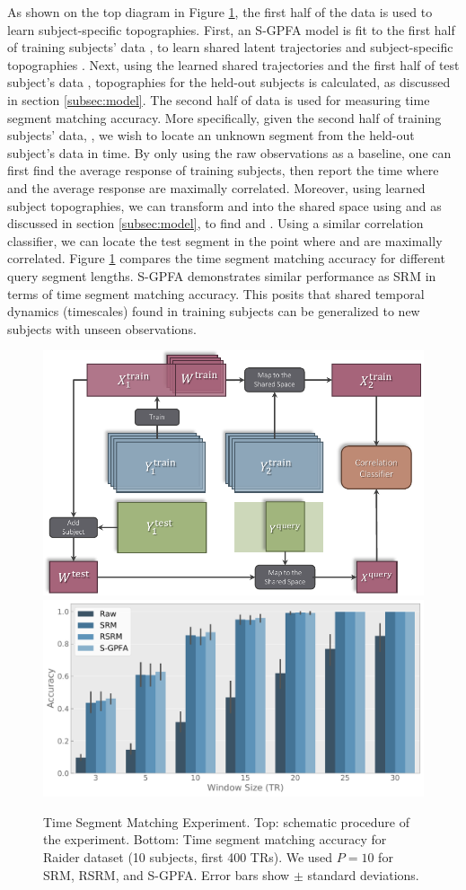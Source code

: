 As shown on the top diagram in Figure \ref{fig:tsm}, the first half of the data is used to learn subject-specific topographies. First, an S-GPFA model is fit to the first half of training subjects' data , to learn shared latent trajectories  and subject-specific topographies \wtrain. Next, using the learned shared trajectories  and the first half of test subject's data , topographies for the held-out subjects \wtest is calculated, as discussed in section \ref{subsec:model}. The second half of data is used for measuring time segment matching accuracy. More specifically, given the second half of training subjects' data, , we wish to locate an unknown segment from the held-out subject's data \yseg in time. By only using the raw observations as a baseline, one can first find the average response of training subjects, then report the time where \yseg and the average response are maximally correlated. Moreover, using learned subject topographies, we can transform  and \yseg into the shared space using \wtrain and \wtest as discussed in section \ref{subsec:model}, to find  and \xseg. Using a similar correlation classifier, we can locate the test segment in the point where  and \xseg are maximally correlated. Figure \ref{fig:tsm} compares the time segment matching accuracy for different query segment lengths. S-GPFA demonstrates similar performance as SRM in terms of time segment matching accuracy. This posits that shared temporal dynamics (timescales) found in training subjects can be generalized to new subjects with unseen observations. 

\begin{figure}[tb!]
    \centering
    \includegraphics[width=.5\linewidth]{figures/ch1/tsm_blockdiagram.pdf}
    \vspace{1em}
    \includegraphics[width=.6\linewidth]{figures/ch1/tsm_raider_p10_sm200_2.pdf}
    \caption{Time Segment Matching Experiment. Top: schematic procedure of the experiment. Bottom: Time segment matching accuracy for Raider dataset (10 subjects, first 400 TRs). We used $P= 10$ for SRM, RSRM, and S-GPFA. Error bars show $\pm$ standard deviations.}
    \label{fig:tsm}
\end{figure}

